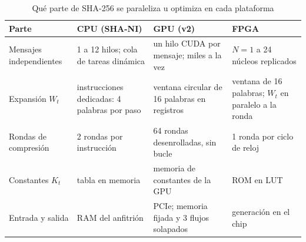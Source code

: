 \begin{table}[htbp]
  \caption{Qué parte de SHA-256 se paraleliza u optimiza en cada plataforma}
  \label{tab:strategy}
  \centering
  \footnotesize
  \setlength{\tabcolsep}{3pt}
  \begin{tabular}{@{}p{1.45cm}p{2.2cm}p{2.2cm}p{2.2cm}@{}}
    \toprule
    \textbf{Parte} & \textbf{CPU (SHA-NI)} & \textbf{GPU (v2)} & \textbf{FPGA} \\
    \midrule
    Mensajes independientes & \raggedright 1 a 12 hilos; cola de tareas dinámica & \raggedright un hilo CUDA por mensaje; miles a la vez & $N = 1$ a 24 núcleos replicados \\
    \addlinespace
    Expansión $W_t$ & \raggedright instrucciones dedicadas: 4 palabras por paso & \raggedright ventana circular de 16 palabras en registros & ventana de 16 palabras; $W_t$ en paralelo a la ronda \\
    \addlinespace
    Rondas de compresión & \raggedright 2 rondas por instrucción & \raggedright 64 rondas desenrolladas, sin bucle & 1 ronda por ciclo de reloj \\
    \addlinespace
    Constantes $K_t$ & \raggedright tabla en memoria & \raggedright memoria de constantes de la GPU & ROM en LUT \\
    \addlinespace
    Entrada y salida & \raggedright RAM del anfitrión & \raggedright PCIe; memoria fijada y 3 flujos solapados & generación en el chip \\
    \bottomrule
  \end{tabular}
\end{table}
